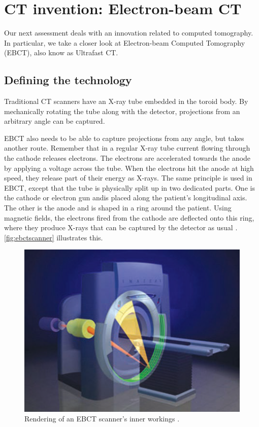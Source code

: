 \section{CT invention: Electron-beam CT}
Our next assessment deals with an innovation related to computed tomography. In
particular, we take a closer look at Electron-beam Computed Tomography (EBCT),
also know as Ultrafast CT.

\subsection{Defining the technology}
Traditional CT scanners have an X-ray tube embedded in the toroid body. By
mechanically rotating the tube along with the detector, projections from an
arbitrary angle can be captured.

EBCT also needs to be able to capture projections from any angle, but takes
another route. Remember that in a regular X-ray tube current flowing through the
cathode releases electrons. The electrons are accelerated towards the anode by
applying a voltage across the tube. When the electrons hit the anode at high
speed, they release part of their energy as X-rays. The same principle is used
in EBCT, except that the tube is physically split up in two dedicated parts. One
is the cathode or electron gun andis placed along the patient's longitudinal
axis. The other is the anode and is shaped in a ring around the patient. Using
magnetic fields, the electrons fired from the cathode are deflected onto this
ring, where they produce X-rays that can be captured by the detector as usual
\cite{suetens}. \autoref{fig:ebctscanner} illustrates this.

\begin{figure}[ht]
\begin{center}
  \includegraphics[width=\linewidth]{img/EBCT.png}
  \caption{Rendering of an EBCT scanner's inner workings \cite{suetens}.}
  \label{fig:ebctscanner}
\end{center}
\end{figure}

